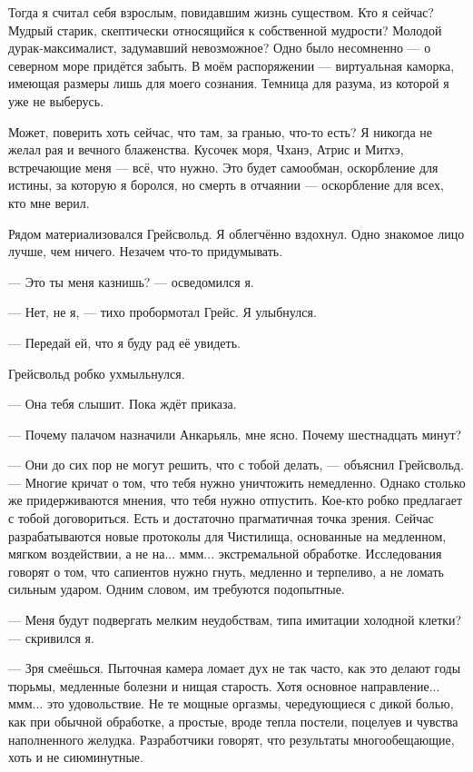 Тогда я считал себя взрослым, повидавшим жизнь существом.
Кто я сейчас?
Мудрый старик, скептически относящийся к собственной мудрости?
Молодой дурак-максималист, задумавший невозможное?
Одно было несомненно --- о северном море придётся забыть.
В моём распоряжении --- виртуальная каморка, имеющая размеры лишь для моего сознания.
Темница для разума, из которой я уже не выберусь.

Может, поверить хоть сейчас, что там, за гранью, что-то есть?
Я никогда не желал рая и вечного блаженства.
Кусочек моря, Чханэ, Атрис и Митхэ, встречающие меня --- всё, что нужно.
Это будет самообман, оскорбление для истины, за которую я боролся, но смерть в отчаянии --- оскорбление для всех, кто мне верил.

Рядом материализовался Грейсвольд.
Я облегчённо вздохнул.
Одно знакомое лицо лучше, чем ничего.
Незачем что-то придумывать.

--- Это ты меня казнишь? --- осведомился я.

--- Нет, не я, --- тихо пробормотал Грейс.
Я улыбнулся.

--- Передай ей, что я буду рад её увидеть.

Грейсвольд робко ухмыльнулся.

--- Она тебя слышит.
Пока ждёт приказа.

--- Почему палачом назначили Анкарьяль, мне ясно.
Почему шестнадцать минут?

--- Они до сих пор не могут решить, что с тобой делать, --- объяснил Грейсвольд.
--- Многие кричат о том, что тебя нужно уничтожить немедленно.
Однако столько же придерживаются мнения, что тебя нужно отпустить.
Кое-кто робко предлагает с тобой договориться.
Есть и достаточно прагматичная точка зрения.
Сейчас разрабатываются новые протоколы для Чистилища, основанные на медленном, мягком воздействии, а не на... ммм... экстремальной обработке.
Исследования говорят о том, что сапиентов нужно гнуть, медленно и терпеливо, а не ломать сильным ударом.
Одним словом, им требуются подопытные.

--- Меня будут подвергать мелким неудобствам, типа имитации холодной клетки? --- скривился я.

--- Зря смеёшься.
Пыточная камера ломает дух не так часто, как это делают годы тюрьмы, медленные болезни и нищая старость.
Хотя основное направление... ммм... это удовольствие.
Не те мощные оргазмы, чередующиеся с дикой болью, как при обычной обработке, а простые, вроде тепла постели, поцелуев и чувства наполненного желудка.
Разработчики говорят, что результаты многообещающие, хоть и не сиюминутные.

